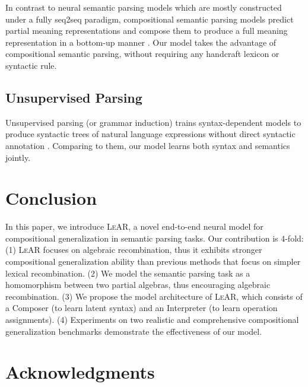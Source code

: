 \documentclass[11pt,a4paper]{article}
\begin{document}
In contrast to neural semantic parsing models which are mostly constructed under a fully seq2seq paradigm, compositional semantic parsing models predict partial meaning representations and compose them to produce a full meaning representation in a bottom-up manner \cite{zelle1996learning-csp, zettlemoyer2012learning-csp, liang2013learning-csp, berant2013semantic-csp, berant2015imitation-csp, pasupat2015compositional-csp, herzig2020span-csp}.
Our model takes the advantage of compositional semantic parsing, without requiring any handcraft lexicon or syntactic rule.

\subsection{Unsupervised Parsing}





Unsupervised parsing (or grammar induction) trains syntax-dependent models to produce syntactic trees of natural language expressions without direct syntactic annotation \cite{klein2002natural-unsup,  bod2006all-unsup, ponvert2011simple-unsup, pate2016grammar, shen2018ordered-unsup, kim2019compound-unsup, drozdov2020unsupervised-unsup}.
Comparing to them, our model learns both syntax and semantics jointly.

\section{Conclusion}

In this paper, we introduce \textsc{LeAR}, a novel end-to-end neural model for compositional generalization in semantic parsing tasks.
Our contribution is 4-fold:
(1) \textsc{LeAR} focuses on algebraic recombination, thus it exhibits stronger compositional generalization ability than previous methods that focus on simpler lexical recombination.
(2) We model the semantic parsing task as a homomorphism between two partial algebras, thus encouraging algebraic recombination.
(3) We propose the model architecture of \textsc{LeAR}, which consists of a Composer (to learn latent syntax) and an Interpreter (to learn operation assignments).
(4) Experiments on two realistic and comprehensive compositional generalization benchmarks demonstrate the effectiveness of our model.

\section*{Acknowledgments} 
\end{document}
